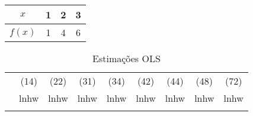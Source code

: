 \documentclass[12pt,a4paper]{article}
\begin{document}
\begin{tabular}{c|ccc}
  $x$ & 1 & 2 & 3 \\ \hline
  $f(x)$ & 1 & 4 & 6
\end{tabular}

\begin{table}[h]
  \centering
  \caption{Estimações OLS}\label{table:estimations_table}

  \begin{tabular}{lcccccccc}
  \hline

  \noalign{\smallskip}
  \multirow{2}{*}{VARIÁVEIS} & (14) & (22) & (31) & (34) & (42) & (44) & (48) & (72) \\
                             & lnhw & lnhw & lnhw & lnhw & lnhw & lnhw & lnhw & lnhw \\
  \noalign{\smallskip}

  \hline


\end{tabular}
\end{table}
\end{document}
